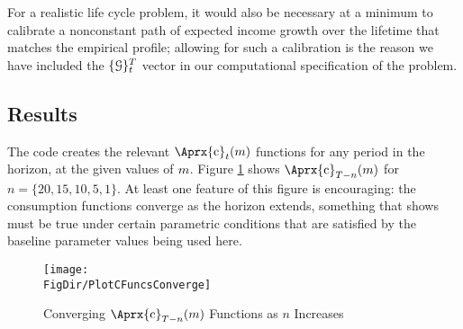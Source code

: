For a realistic life cycle problem, it would also be necessary at a
minimum to calibrate a nonconstant path of expected income growth over the
lifetime that matches the empirical profile; allowing for such
a calibration is the reason we have included the $\{\mathcal{G}\}_{t}^{T}$
vector in our computational specification of the problem.

\hypertarget{results}{}
\subsection{Results}

The code creates the relevant $\Aprx{\cFunc}_{\prd}(\mNrm)$ functions for any period in the horizon, at the given values of $m$.  Figure \ref{fig:PlotCFuncsConverge} shows $\Aprx{\cFunc}_{T-n}({m})$ for $n=\{20,15,10,5,1\}$.  At least one feature of this figure is encouraging: the consumption functions converge as the horizon extends, something that \cite{BufferStockTheory} shows must be true under certain parametric conditions that are satisfied by the baseline parameter values being used here.

\hypertarget{PlotCFuncsConverge}{}
\begin{figure}
  \texttt{[image: \\FigDir/PlotCFuncsConverge]}
  \caption{Converging $\Aprx{\cFunc}_{T-n}({\mNrm})$ Functions as $n$ Increases}
  \label{fig:PlotCFuncsConverge}
\end{figure}


